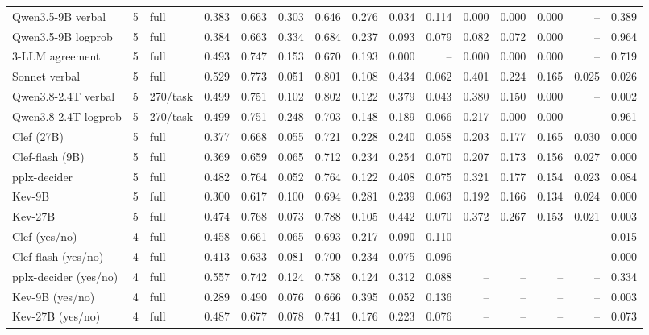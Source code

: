 \begin{table}[t]
\begin{adjustbox}{max width=\linewidth}
\begin{tabular}{lrlrrrrrrrrrrrr}
Qwen3.5-9B verbal & 5 & full & 0.383 & 0.663 & 0.303 & 0.646 & 0.276 & 0.034 & 0.114 & 0.000 & 0.000 & 0.000 & -- & 0.389 \\
Qwen3.5-9B logprob & 5 & full & 0.384 & 0.663 & 0.334 & 0.684 & 0.237 & 0.093 & 0.079 & 0.082 & 0.072 & 0.000 & -- & 0.964 \\
3-LLM agreement & 5 & full & 0.493 & 0.747 & 0.153 & 0.670 & 0.193 & 0.000 & -- & 0.000 & 0.000 & 0.000 & -- & 0.719 \\
Sonnet verbal & 5 & full & 0.529 & 0.773 & 0.051 & 0.801 & 0.108 & 0.434 & 0.062 & 0.401 & 0.224 & 0.165 & 0.025 & 0.026 \\
Qwen3.8-2.4T verbal & 5 & 270/task & 0.499 & 0.751 & 0.102 & 0.802 & 0.122 & 0.379 & 0.043 & 0.380 & 0.150 & 0.000 & -- & 0.002 \\
Qwen3.8-2.4T logprob & 5 & 270/task & 0.499 & 0.751 & 0.248 & 0.703 & 0.148 & 0.189 & 0.066 & 0.217 & 0.000 & 0.000 & -- & 0.961 \\
Clef (27B) & 5 & full & 0.377 & 0.668 & 0.055 & 0.721 & 0.228 & 0.240 & 0.058 & 0.203 & 0.177 & 0.165 & 0.030 & 0.000 \\
Clef-flash (9B) & 5 & full & 0.369 & 0.659 & 0.065 & 0.712 & 0.234 & 0.254 & 0.070 & 0.207 & 0.173 & 0.156 & 0.027 & 0.000 \\
pplx-decider & 5 & full & 0.482 & 0.764 & 0.052 & 0.764 & 0.122 & 0.408 & 0.075 & 0.321 & 0.177 & 0.154 & 0.023 & 0.084 \\
Kev-9B & 5 & full & 0.300 & 0.617 & 0.100 & 0.694 & 0.281 & 0.239 & 0.063 & 0.192 & 0.166 & 0.134 & 0.024 & 0.000 \\
Kev-27B & 5 & full & 0.474 & 0.768 & 0.073 & 0.788 & 0.105 & 0.442 & 0.070 & 0.372 & 0.267 & 0.153 & 0.021 & 0.003 \\
Clef (yes/no) & 4 & full & 0.458 & 0.661 & 0.065 & 0.693 & 0.217 & 0.090 & 0.110 & -- & -- & -- & -- & 0.015 \\
Clef-flash (yes/no) & 4 & full & 0.413 & 0.633 & 0.081 & 0.700 & 0.234 & 0.075 & 0.096 & -- & -- & -- & -- & 0.000 \\
pplx-decider (yes/no) & 4 & full & 0.557 & 0.742 & 0.124 & 0.758 & 0.124 & 0.312 & 0.088 & -- & -- & -- & -- & 0.334 \\
Kev-9B (yes/no) & 4 & full & 0.289 & 0.490 & 0.076 & 0.666 & 0.395 & 0.052 & 0.136 & -- & -- & -- & -- & 0.003 \\
Kev-27B (yes/no) & 4 & full & 0.487 & 0.677 & 0.078 & 0.741 & 0.176 & 0.223 & 0.076 & -- & -- & -- & -- & 0.073 \\
\bottomrule
\end{tabular}

\end{adjustbox}
\end{table}
